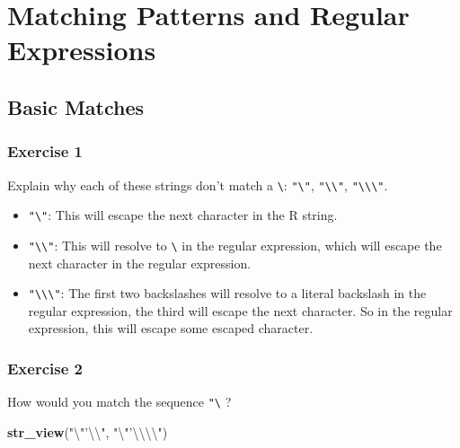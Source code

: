 \documentclass[]{book}
\newenvironment{Shaded}{\begin{snugshade}}{\end{snugshade}}
\newcommand{\CharTok}[1]{\textcolor[rgb]{0.31,0.60,0.02}{#1}}
\newcommand{\KeywordTok}[1]{\textcolor[rgb]{0.13,0.29,0.53}{\textbf{#1}}}
\newcommand{\NormalTok}[1]{#1}
\newcommand{\StringTok}[1]{\textcolor[rgb]{0.31,0.60,0.02}{#1}}
\providecommand{\tightlist}{%
  \setlength{\itemsep}{0pt}\setlength{\parskip}{0pt}}
\theoremstyle{definition}
\theoremstyle{definition}
\theoremstyle{definition}
\theoremstyle{remark}
\begin{document}
\hypertarget{matching-patterns-and-regular-expressions}{%
\section{Matching Patterns and Regular
Expressions}\label{matching-patterns-and-regular-expressions}}

\hypertarget{basic-matches}{%
\subsection{Basic Matches}\label{basic-matches}}

\hypertarget{exercise-1-26}{%
\subsubsection{Exercise 1}\label{exercise-1-26}}

Explain why each of these strings don't match a
\texttt{\textbackslash{}}: \texttt{"\textbackslash{}"},
\texttt{"\textbackslash{}\textbackslash{}"},
\texttt{"\textbackslash{}\textbackslash{}\textbackslash{}"}.

\begin{itemize}
\tightlist
\item
  \texttt{"\textbackslash{}"}: This will escape the next character in
  the R string.
\item
  \texttt{"\textbackslash{}\textbackslash{}"}: This will resolve to
  \texttt{\textbackslash{}} in the regular expression, which will escape
  the next character in the regular expression.
\item
  \texttt{"\textbackslash{}\textbackslash{}\textbackslash{}"}: The first
  two backslashes will resolve to a literal backslash in the regular
  expression, the third will escape the next character. So in the
  regular expression, this will escape some escaped character.
\end{itemize}

\hypertarget{exercise-2-25}{%
\subsubsection{Exercise 2}\label{exercise-2-25}}

How would you match the sequence
\texttt{"\textquotesingle{}\textbackslash{}} ?

\begin{Shaded}
\begin{Highlighting}[]
\KeywordTok{str_view}\NormalTok{(}\StringTok{"}\CharTok{\textbackslash{}"}\StringTok{'}\CharTok{\textbackslash{}\textbackslash{}}\StringTok{"}\NormalTok{, }\StringTok{"}\CharTok{\textbackslash{}"}\StringTok{'}\CharTok{\textbackslash{}\textbackslash{}\textbackslash{}\textbackslash{}}\StringTok{"}\NormalTok{)}
\end{Highlighting}
\end{Shaded}
\end{document}

